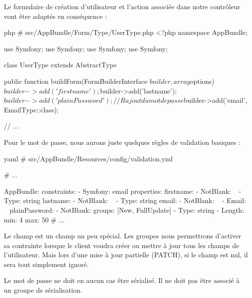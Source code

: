 \documentclass[big]{zmdocument}
\begin{document}
Le formulaire de création d'utilisateur et l'action associée dans notre contrôleur vont être adaptés en conséquence :



\begin{CodeBlock}{php}
# src/AppBundle/Form/Type/UserType.php
<?php
namespace AppBundle\Form\Type;

use Symfony\Component\Form\AbstractType;
use Symfony\Component\Form\FormBuilderInterface;
use Symfony\Component\OptionsResolver\OptionsResolver;
use Symfony\Component\Form\Extension\Core\Type\EmailType;

class UserType extends AbstractType
{
    public function buildForm(FormBuilderInterface $builder, array $options)
    {
        $builder->add('firstname');
        $builder->add('lastname');
        $builder->add('plainPassword'); // Rajout du mot de passe 
        $builder->add('email', EmailType::class);
    }

    // ...
}
\end{CodeBlock}



Pour le mot de passe, nous aurons juste quelques règles de validation basiques :



\begin{CodeBlock}{yaml}
# src/AppBundle/Resources/config/validation.yml

# ...

AppBundle\Entity\User:
    constraints:
        - Symfony\Bridge\Doctrine\Validator\Constraints\UniqueEntity: email
    properties:
        firstname:
            - NotBlank: ~
            - Type: string
        lastname:
            - NotBlank: ~
            - Type: string
        email:
            - NotBlank: ~
            - Email: ~
        plainPassword:
            - NotBlank: { groups: [New, FullUpdate] }
            - Type: string
            - Length:
                min: 4
                max: 50
# ...
\end{CodeBlock}



Le champ  est un champ un peu spécial. Les groupes nous permettrons d'activer sa contrainte  lorsque le client voudra créer ou mettre à jour tous les champs de l'utilisateur. Mais lors d'une mise à jour partielle (PATCH), si le champ est nul, il sera tout simplement ignoré.



\begin{Error}
Le mot de passe ne doit en aucun cas être sérialisé. Il ne doit pas être associé à un groupe de sérialisation.
\end{Error}
\end{document}
